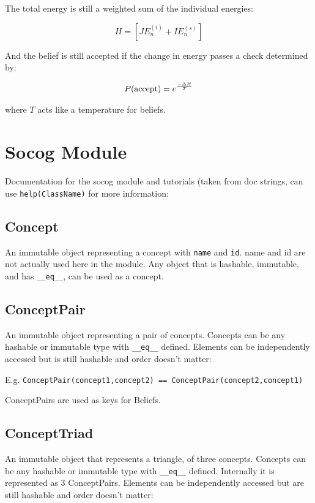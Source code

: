 \documentclass[11pt, a4paper]{article}
\begin{document}
The total energy is still a weighted sum of the individual energies:

\begin{equation}\label{eq:ham}
%
H = \left[ J E_n^{(i)} + I E_n^{(s)} \right] %
%
\end{equation}

And the belief is still accepted if the change in energy passes a check determined by:

\begin{eqnarray}
P(\textup{accept})=e^{\frac{-\Delta H}{T}}
\end{eqnarray}

where $T$ acts like a temperature for beliefs.

\section{Socog Module}

Documentation for the socog module and tutorials (taken from doc strings, can use \texttt{help(ClassName)} for more information:

\subsection{Concept}
An immutable object representing a concept with \texttt{name} and \texttt{id}. name and id are not actually used here in the module. Any object that is hashable, immutable, and has \texttt{\_\_eq\_\_}, can be used as a concept.

\subsection{ConceptPair}
An immutable object representing a pair of concepts. Concepts can be any hashable or immutable type with \texttt{\_\_eq\_\_} defined. Elements can be independently accessed but is still hashable and order doesn't matter: 

E.g. \texttt{ConceptPair(concept1,concept2) == ConceptPair(concept2,concept1)}

ConceptPairs are used as keys for Beliefs.

\subsection{ConceptTriad}
An immutable object that represents a triangle, of three concepts. Concepts can be any hashable or immutable type with \texttt{\_\_eq\_\_} defined. Internally it is represented as 3 ConceptPairs. Elements can be independently accessed but are still hashable and order doesn't matter: 
\end{document}
